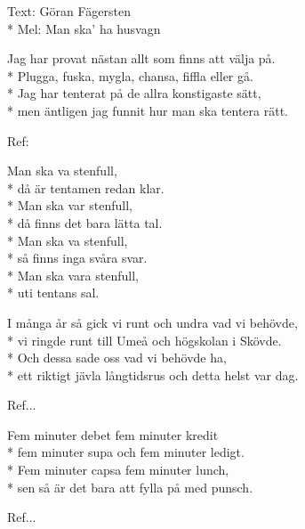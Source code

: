 \begin{SongText}[Tentalåt]
    \begin{SongInfo}
        Text: Göran Fägersten\\*%
        Mel: Man ska’ ha husvagn
    \end{SongInfo}
    \begin{SongVerse}
        Jag har provat nästan allt som finns att välja på.\\*%
        Plugga, fuska, mygla, chansa, fiffla eller gå.\\*%
        Jag har tenterat på de allra konstigaste sätt,\\*%
        men äntligen jag funnit hur man ska tentera rätt.
    \end{SongVerse}
    \begin{SongVerse}
        Ref:
    \end{SongVerse}
    \begin{SongVerse}
        Man ska va stenfull,\\*%
        då är tentamen redan klar.\\*%
        Man ska var stenfull,\\*%
        då finns det bara lätta tal.\\*%
        Man ska va stenfull,\\*%
        så finns inga svåra svar.\\*%
        Man ska vara stenfull,\\*%
        uti tentans sal.
    \end{SongVerse}
    \begin{SongVerse}
        I många år så gick vi runt och undra vad vi behövde,\\*%
        vi ringde runt till Umeå och högskolan i Skövde.\\*%
        Och dessa sade oss vad vi behövde ha,\\*%
        ett riktigt jävla långtidsrus och detta helst var dag.
    \end{SongVerse}
    \begin{SongVerse}
        Ref...
    \end{SongVerse}
    \begin{SongVerse}
        Fem minuter debet fem minuter kredit\\*%
        fem minuter supa och fem minuter ledigt.\\*%
        Fem minuter capsa fem minuter lunch,\\*%
        sen så är det bara att fylla på med punsch.
    \end{SongVerse}
    \begin{SongVerse}
        Ref...
    \end{SongVerse}
\end{SongText}

